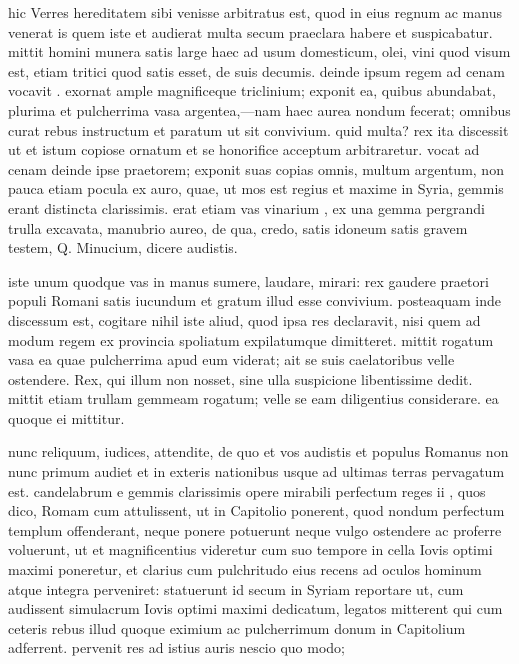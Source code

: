  hic Verres hereditatem sibi venisse arbitratus est, quod in eius regnum ac manus venerat is quem iste et audierat multa secum praeclara habere et suspicabatur. mittit homini munera satis large haec ad usum domesticum, olei, vini quod visum est, etiam tritici quod satis esset, de suis decumis. deinde ipsum regem ad cenam vocavit . exornat ample magnificeque triclinium; exponit ea, quibus abundabat, plurima et pulcherrima vasa argentea,—nam haec aurea nondum fecerat; omnibus curat rebus instructum et paratum ut sit convivium. quid multa? rex ita discessit ut et istum copiose ornatum et se honorifice acceptum arbitraretur. vocat ad cenam deinde ipse praetorem; exponit suas copias omnis, multum argentum, non pauca etiam pocula ex auro, quae, ut mos est regius et maxime in Syria, gemmis erant distincta clarissimis. erat etiam vas vinarium , ex una gemma pergrandi trulla excavata, manubrio aureo, de qua, credo, satis idoneum satis gravem testem, Q. Minucium, dicere audistis.

 iste unum quodque vas in manus sumere, laudare, mirari: rex gaudere praetori populi Romani satis iucundum et gratum illud esse convivium. posteaquam inde discessum est, cogitare nihil iste aliud, quod ipsa res declaravit, nisi quem ad modum regem ex provincia spoliatum expilatumque dimitteret. mittit rogatum vasa ea quae pulcherrima apud eum viderat; ait se suis caelatoribus velle ostendere. Rex, qui illum non nosset, sine ulla suspicione libentissime dedit. mittit etiam trullam gemmeam rogatum; velle se eam diligentius considerare. ea quoque ei mittitur.

 nunc reliquum, iudices, attendite, de quo et vos audistis et populus Romanus non nunc primum audiet et in exteris nationibus usque ad ultimas terras pervagatum est. candelabrum e gemmis clarissimis opere mirabili perfectum reges ii , quos dico, Romam cum attulissent, ut in Capitolio ponerent, quod nondum perfectum templum offenderant, neque ponere potuerunt neque vulgo ostendere ac proferre voluerunt, ut et magnificentius videretur cum suo tempore in cella Iovis optimi maximi poneretur, et clarius cum pulchritudo eius recens ad oculos hominum atque integra perveniret: statuerunt id secum in Syriam reportare ut, cum audissent simulacrum Iovis optimi maximi dedicatum, legatos mitterent qui cum ceteris rebus illud quoque eximium ac pulcherrimum donum in Capitolium adferrent. pervenit res ad istius auris nescio quo modo;

